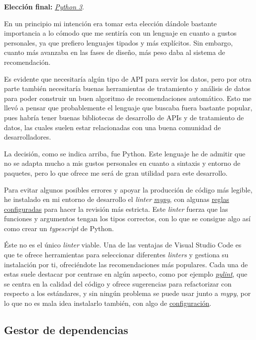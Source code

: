 \textbf{Elección final:} \href{https://www.python.org/}{\textit{Python 3}}.

En un principio mi intención era tomar esta elección dándole bastante importancia a lo cómodo que me sentiría con un lenguaje en cuanto a gustos personales, ya que prefiero lenguajes tipados y más explícitos. Sin embargo, cuanto más avanzaba en las fases de diseño, más peso daba al sistema de recomendación. 

Es evidente que necesitaría algún tipo de API para servir los datos, pero por otra parte también necesitaría buenas herramientas de tratamiento y análisis de datos para poder construir un buen algoritmo de recomendaciones automático. Esto me llevó a pensar que probablemente el lenguaje que buscaba fuera bastante popular, pues habría tener buenas bibliotecas de desarrollo de APIs y de tratamiento de datos, las cuales suelen estar relacionadas con una buena comunidad de desarrolladores.

La decisión, como se indica arriba, fue Python. Este lenguaje he de admitir que no se adapta mucho a mis gustos personales en cuanto a sintaxis y entorno de paquetes, pero lo que ofrece me será de gran utilidad para este desarrollo.

Para evitar algunos posibles errores y apoyar la producción de código más legible, he instalado en mi entorno de desarrollo el \textit{linter} \href{http://mypy-lang.org/}{\textit{mypy}}, con algunas \href{https://github.com/Anglepi/My-Many-Reads/blob/main/.mypy.ini}{reglas configuradas} para hacer la revisión más estricta. Este \textit{linter} fuerza que las funciones y argumentos tengan los tipos correctos, con lo que se consigue algo así como crear un \textit{typescript} de Python.

Éste no es el único \textit{linter} viable. Una de las ventajas de Visual Studio Code es que te ofrece herramientas para seleccionar diferentes \textit{linters} y gestiona su instalación por ti, ofreciéndote las recomendaciones más populares. Cada una de estas suele destacar por centrase en algún aspecto, como por ejemplo \href{https://pypi.org/project/pylint/}{\textit{pylint}}, que se centra en la calidad del código y ofrece sugerencias para refactorizar con respecto a los estándares, y sin ningún problema se puede usar junto a \textit{mypy}, por lo que no es mala idea instalarlo también, con algo de \href{https://github.com/Anglepi/My-Many-Reads/blob/main/.pylintrc.ini}{configuración}.

\subsection{Gestor de dependencias}

